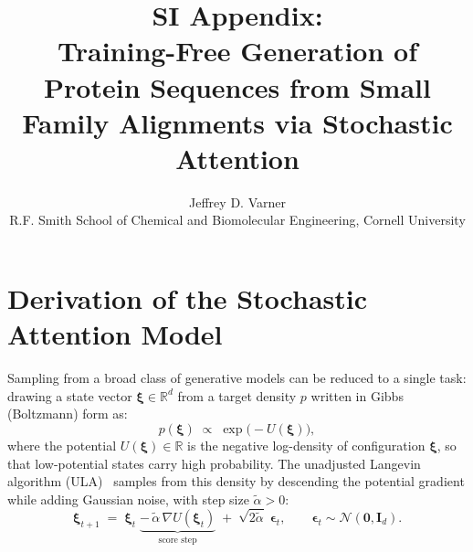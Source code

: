 \documentclass[10pt]{article}
\title{SI Appendix:\\Training-Free Generation of Protein Sequences from Small Family Alignments via Stochastic Attention}
\author{Jeffrey D. Varner\\
R.F. Smith School of Chemical and Biomolecular Engineering, Cornell University}
\date{}
\begin{document}
\maketitle

\section{Derivation of the Stochastic Attention Model}\label{si:derivation}
Sampling from a broad class of generative models can be reduced to a single task: drawing a state vector $\boldsymbol{\xi}\in\mathbb{R}^d$ from a target density
$p$ written in Gibbs (Boltzmann) form as:
\[
  p(\boldsymbol{\xi}) \;\propto\; \exp\!\bigl(-U(\boldsymbol{\xi})\bigr),
\]
where the potential $U(\boldsymbol{\xi})\in\mathbb{R}$ is the negative log-density of configuration $\boldsymbol{\xi}$, so that low-potential states carry high probability.
The unadjusted Langevin algorithm (ULA)~\cite{robertsTweedieExponentialConvergence1996} samples from this density by descending the
potential gradient while adding Gaussian noise, with step size $\tilde\alpha>0$:
\[
  \boldsymbol{\xi}_{t+1} \;=\;
  \boldsymbol{\xi}_t
  \;\underbrace{-\,\tilde\alpha\,\nabla U(\boldsymbol{\xi}_t)}_{\textstyle\text{score step}}
  \;+\; \sqrt{2\tilde\alpha}\;\boldsymbol{\epsilon}_t,
  \qquad \boldsymbol{\epsilon}_t\sim\mathcal{N}(\mathbf{0},\mathbf{I}_d).
\]
\end{document}
